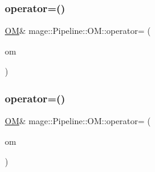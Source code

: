 \subsubsection{\texorpdfstring{operator=()}{operator=()}\hspace{0.1cm}{\footnotesize\ttfamily [1/2]}}
{\footnotesize\ttfamily \hyperlink{structmage_1_1_pipeline_1_1_o_m}{OM}\& mage\+::\+Pipeline\+::\+O\+M\+::operator= (\begin{DoxyParamCaption}\item[{const \hyperlink{structmage_1_1_pipeline_1_1_o_m}{OM} \&}]{om }\end{DoxyParamCaption})\hspace{0.3cm}{\ttfamily [delete]}}

\hypertarget{structmage_1_1_pipeline_1_1_o_m_af65bb4fbcd0d5d49aae7354ec9104680}{}\label{structmage_1_1_pipeline_1_1_o_m_af65bb4fbcd0d5d49aae7354ec9104680} 
\subsubsection{\texorpdfstring{operator=()}{operator=()}\hspace{0.1cm}{\footnotesize\ttfamily [2/2]}}
{\footnotesize\ttfamily \hyperlink{structmage_1_1_pipeline_1_1_o_m}{OM}\& mage\+::\+Pipeline\+::\+O\+M\+::operator= (\begin{DoxyParamCaption}\item[{\hyperlink{structmage_1_1_pipeline_1_1_o_m}{OM} \&\&}]{om }\end{DoxyParamCaption})\hspace{0.3cm}{\ttfamily [delete]}}

